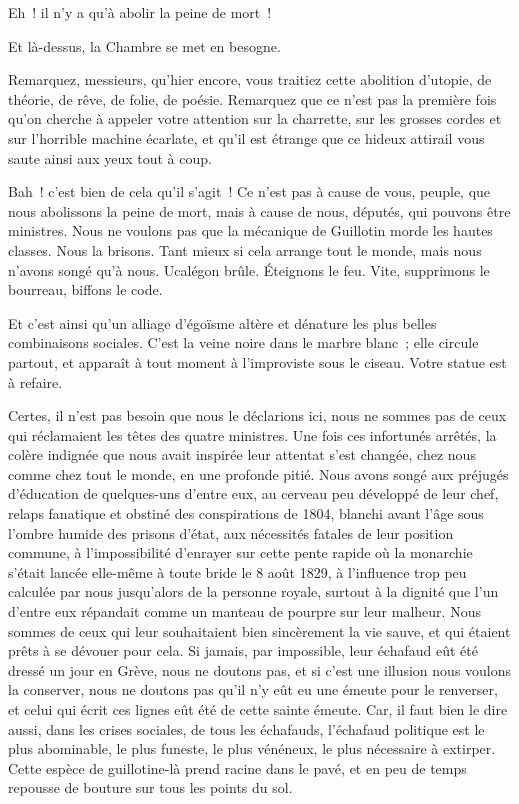 \documentclass[french,twoside]{book} %
\begin{document}
Eh ! il n’y a qu’à abolir la peine de mort !\par
Et là-dessus, la Chambre se met en besogne.\par
Remarquez, messieurs, qu’hier encore, vous traitiez cette abolition d’utopie, de théorie, de rêve, de folie, de poésie. Remarquez que ce n’est pas la première fois qu’on cherche à appeler votre attention sur la charrette, sur les grosses cordes et sur l’horrible machine écarlate, et qu’il est étrange que ce hideux attirail vous saute ainsi aux yeux tout à coup.\par
Bah ! c’est bien de cela qu’il s’agit ! Ce n’est pas à cause de vous, peuple, que nous abolissons la peine de mort, mais à cause de nous, députés, qui pouvons être ministres. Nous ne voulons pas que la mécanique de Guillotin morde les hautes classes. Nous la brisons. Tant mieux si cela arrange tout le monde, mais nous n’avons songé qu’à nous. Ucalégon brûle. Éteignons le feu. Vite, supprimons le bourreau, biffons le code.\par
Et c’est ainsi qu’un alliage d’égoïsme altère et dénature les plus belles combinaisons sociales. C’est la veine noire dans le marbre blanc ; elle circule partout, et apparaît à tout moment à l’improviste sous le ciseau. Votre statue est à refaire.\par
Certes, il n’est pas besoin que nous le déclarions ici, nous ne sommes pas de ceux qui réclamaient les têtes des quatre ministres. Une fois ces infortunés arrêtés, la colère  indignée que nous avait inspirée leur attentat s’est changée, chez nous comme chez tout le monde, en une profonde pitié. Nous avons songé aux préjugés d’éducation de quelques-uns d’entre eux, au cerveau peu développé de leur chef, relaps fanatique et obstiné des conspirations de 1804, blanchi avant l’âge sous l’ombre humide des prisons d’état, aux nécessités fatales de leur position commune, à l’impossibilité d’enrayer sur cette pente rapide où la monarchie s’était lancée elle-même à toute bride le 8 août 1829, à l’influence trop peu calculée par nous jusqu’alors de la personne royale, surtout à la dignité que l’un d’entre eux répandait comme un manteau de pourpre sur leur malheur. Nous sommes de ceux qui leur souhaitaient bien sincèrement la vie sauve, et qui étaient prêts à se dévouer pour cela. Si jamais, par impossible, leur échafaud eût été dressé un jour en Grève, nous ne doutons pas, et si c’est une illusion nous voulons la conserver, nous ne doutons pas qu’il n’y eût eu une émeute pour le renverser, et celui qui écrit ces lignes eût été de cette sainte émeute. Car, il faut bien le dire aussi, dans les crises sociales, de tous les échafauds, l’échafaud politique est le plus abominable, le plus funeste, le plus vénéneux, le plus nécessaire à extirper. Cette espèce de guillotine-là prend racine dans le pavé, et en peu de temps repousse de bouture sur tous les points du sol.\par
\end{document}
